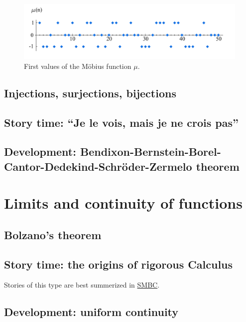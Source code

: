 \documentclass[
	fontsize=10pt, %
	twoside=true, %
	secnumdepth=1, %
	numbers=noenddot, %
]{kaobook}
\begin{document}
\begin{figure}[h]
  \includegraphics{Moebius_mu.png}
  \caption{First values of the Möbius function $\mu$.}
  \label{fig:MobiusMu}
\end{figure}

\section{Injections, surjections, bijections}

\section{Story time: ``Je le vois, mais je ne crois pas''}

\section{Development: Bendixon-Bernstein-Borel-Cantor-Dedekind-Schröder-Zermelo theorem}

\blindtext

\chapter{Limits and continuity of functions}

\section{Bolzano's theorem}

\blindtext

\section{Story time: the origins of rigorous Calculus}
Stories of this type are best summerized in \href{https://www.smbc-comics.com/comic/how-math-works}{SMBC}.

\section{Development: uniform continuity}
\end{document}
